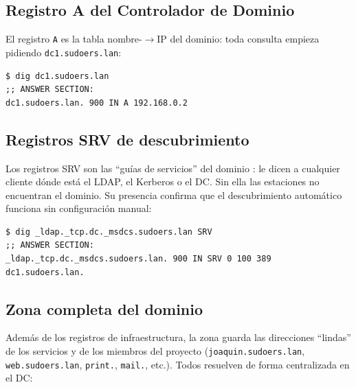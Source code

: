 \subsection{Registro A del Controlador de Dominio}

El registro \texttt{A} es la tabla nombre-$\rightarrow$IP del dominio: toda
consulta empieza pidiendo \texttt{dc1.sudoers.lan}:

\begin{lstlisting}[style=terminal]
$ dig dc1.sudoers.lan
;; ANSWER SECTION:
dc1.sudoers.lan. 900 IN A 192.168.0.2
\end{lstlisting}


\subsection{Registros SRV de descubrimiento}

Los registros SRV son las ``guías de servicios'' del dominio \citep{rfc2782}:
le dicen a cualquier cliente dónde está el LDAP, el Kerberos o el DC. Sin
ella las estaciones no encuentran el dominio. Su presencia confirma que el
descubrimiento automático funciona sin configuración manual:

\begin{lstlisting}[style=terminal]
$ dig _ldap._tcp.dc._msdcs.sudoers.lan SRV
;; ANSWER SECTION:
_ldap._tcp.dc._msdcs.sudoers.lan. 900 IN SRV 0 100 389 dc1.sudoers.lan.
\end{lstlisting}


\subsection{Zona completa del dominio}

Además de los registros de infraestructura, la zona guarda las direcciones
``lindas'' de los servicios y de los miembros del proyecto
(\texttt{joaquin.sudoers.lan}, \texttt{web.sudoers.lan}, \texttt{print.},
\texttt{mail.}, etc.). Todos resuelven de forma centralizada en el DC:

